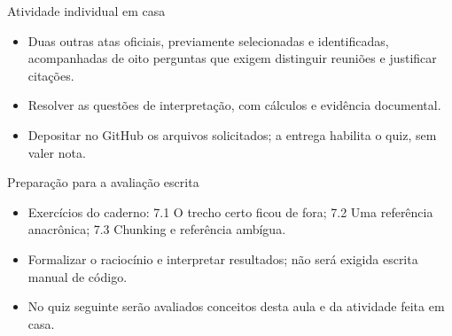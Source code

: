 \documentclass[10pt,aspectratio=169]{beamer}
\begin{document}
\begin{frame}[t]{Atividade individual em casa}
\small
\begin{itemize}
\item Duas outras atas oficiais, previamente selecionadas e identificadas, acompanhadas de oito perguntas que exigem distinguir reuniões e justificar citações.
\item Resolver as questões de interpretação, com cálculos e evidência documental.
\item Depositar no GitHub os arquivos solicitados; a entrega habilita o quiz, sem valer nota.
\end{itemize}
\end{frame}

\begin{frame}[t]{Preparação para a avaliação escrita}
\small
\begin{itemize}
\item Exercícios do caderno: 7.1 O trecho certo ficou de fora; 7.2 Uma referência anacrônica; 7.3 Chunking e referência ambígua.
\item Formalizar o raciocínio e interpretar resultados; não será exigida escrita manual de código.
\item No quiz seguinte serão avaliados conceitos desta aula e da atividade feita em casa.
\end{itemize}
\end{frame}
\end{document}
